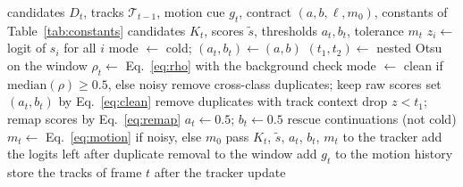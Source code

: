 \begin{algorithm}[t]
\caption{\scl{} for frame $t$. The window holds the logits of frames
$t-W$ to $t-1$, so the decision for frame $t$ uses no future frame.}\label{alg:layer}
\begin{algorithmic}[1]
\Require candidates $D_t$, tracks $\mathcal{T}_{t-1}$, motion cue $g_t$, contract $(a,b,\ell,m_0)$, constants of Table~\ref{tab:constants}
\Ensure candidates $K_t$, scores $\tilde{s}$, thresholds $a_t,b_t$, tolerance $m_t$
\State $z_i\gets$ logit of $s_i$ for all $i$ 
 
  \State mode $\gets$ cold; $(a_t,b_t)\gets(a,b)$
\Else
  \State $(t_1,t_2)\gets$ nested Otsu on the window 
  \State $\rho_t\gets$ Eq.~\eqref{eq:rho} with the background check
  \State mode $\gets$ clean if $\mathrm{median}(\rho)\ge0.5$, else noisy
\EndIf
{} 
  \State remove cross-class duplicates; keep raw scores
   set $(a_t,b_t)$ by Eq.~\eqref{eq:clean}
  \EndIf
\Else {}
  \State remove duplicates with track context
  \State drop $z<t_1$; remap scores by Eq.~\eqref{eq:remap}
  \State $a_t\gets0.5$; $b_t\gets0.5$
\EndIf
\State rescue continuations (not cold) 
\State $m_t\gets$ Eq.~\eqref{eq:motion} if noisy, else $m_0$
\State pass $K_t$, $\tilde{s}$, $a_t$, $b_t$, $m_t$ to the tracker
\State add the logits left after duplicate removal to the window
\State add $g_t$ to the motion history
\State store the tracks of frame $t$ after the tracker update
\end{algorithmic}
\end{algorithm}
